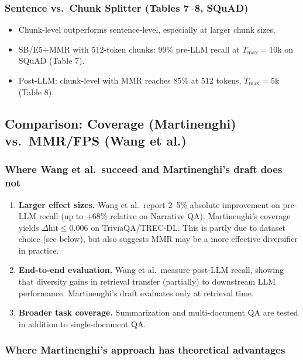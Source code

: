 \documentclass[11pt,a4paper]{article}
\begin{document}
\subsubsection{Sentence vs.\ Chunk Splitter (Tables 7--8, SQuAD)}

\begin{itemize}[leftmargin=*]
	\item Chunk-level outperforms sentence-level, especially at larger chunk sizes.
	\item SB/E5+MMR with 512-token chunks: 99\% pre-LLM recall at $T_{\max} = 10\text{k}$ on SQuAD (Table 7).
	\item Post-LLM: chunk-level with MMR reaches 85\% at 512 tokens, $T_{\max} = 5\text{k}$ (Table 8).
\end{itemize}

\subsection{Comparison: Coverage (Martinenghi) vs.\ MMR/FPS (Wang et al.)}

\subsubsection{Where Wang et al.\ succeed and Martinenghi's draft does not}

\begin{enumerate}[leftmargin=*]
	\item \textbf{Larger effect sizes.} Wang et al.\ report 2--5\% absolute improvement on pre-LLM recall (up to $+68\%$ relative on Narrative QA). Martinenghi's coverage yields $\Delta\text{hit} \leq 0.006$ on TriviaQA/TREC-DL. This is partly due to dataset choice (see below), but also suggests MMR may be a more effective diversifier in practice.
	\item \textbf{End-to-end evaluation.} Wang et al.\ measure post-LLM recall, showing that diversity gains in retrieval transfer (partially) to downstream LLM performance. Martinenghi's draft evaluates only at retrieval time.
	\item \textbf{Broader task coverage.} Summarization and multi-document QA are tested in addition to single-document QA.
\end{enumerate}

\subsubsection{Where Martinenghi's approach has theoretical advantages}
\end{document}
